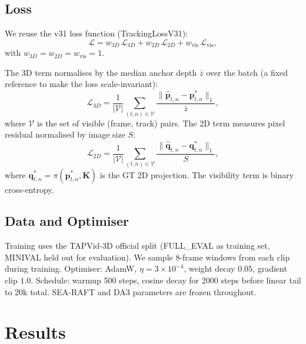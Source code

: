 \documentclass[11pt,a4paper]{article}
\begin{document}
\subsection{Loss}

We reuse the v31 loss function (TrackingLossV31):
\begin{equation}
  \mathcal{L} = w_{3D}\,\mathcal{L}_{3D} + w_{2D}\,\mathcal{L}_{2D} + w_\text{vis}\,\mathcal{L}_\text{vis},
\end{equation}
with $w_{3D} = w_{2D} = w_\text{vis} = 1$.

The 3D term normalises by the median anchor depth $\bar{z}$ over the
batch (a fixed reference to make the loss scale-invariant):
\begin{equation}
  \mathcal{L}_{3D} = \frac{1}{|\mathcal{V}|}
  \sum_{(t,n) \in \mathcal{V}}
  \frac{\|\hat{\bm{p}}_{t,n} - \bm{p}_{t,n}^*\|_1}{\bar{z}},
\end{equation}
where $\mathcal{V}$ is the set of visible (frame, track) pairs.
The 2D term measures pixel residual normalised by image size $S$:
\begin{equation}
  \mathcal{L}_{2D} = \frac{1}{|\mathcal{V}|}
  \sum_{(t,n) \in \mathcal{V}}
  \frac{\|\hat{\bm{q}}_{t,n} - \bm{q}_{t,n}^*\|_1}{S},
\end{equation}
where $\bm{q}_{t,n}^* = \pi(\bm{p}_{t,n}^*, \bm{K})$ is the GT 2D
projection. The visibility term is binary cross-entropy.

\subsection{Data and Optimiser}

Training uses the TAPVid-3D official split (FULL\_EVAL as training set,
MINIVAL held out for evaluation). We sample 8-frame windows from each
clip during training. Optimiser: AdamW, $\eta = 3 \times 10^{-4}$,
weight decay $0.05$, gradient clip $1.0$. Schedule: warmup 500 steps,
cosine decay for 2000 steps before linear tail to 20k total.
SEA-RAFT and DA3 parameters are frozen throughout.

\section{Results}
\label{sec:results}
\end{document}
